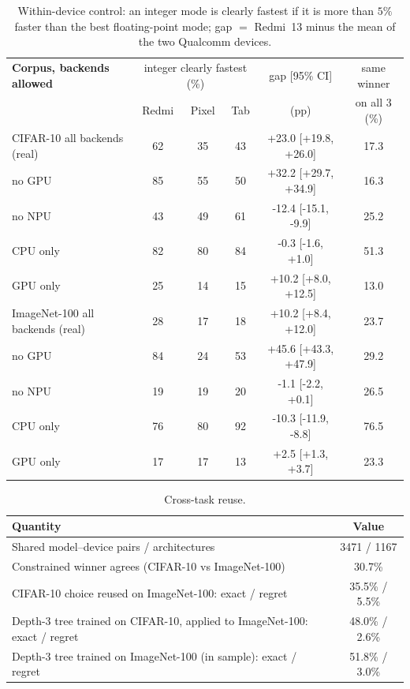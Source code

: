 \begin{table}[!t]
\centering
\caption{Within-device control: an integer mode is clearly fastest if it is more than $5\%$ faster than the best floating-point mode; gap $=$ Redmi~13 minus the mean of the two Qualcomm devices.}
\label{tab:virtual}
\footnotesize
\setlength{\tabcolsep}{3pt}
\begin{tabular}{@{}lccccc@{}}
\toprule
\textbf{Corpus, backends allowed} & \multicolumn{3}{c}{integer clearly fastest (\%)} & gap [95\% CI] & same winner \\
 & Redmi & Pixel & Tab & (pp) & on all 3 (\%) \\
\midrule
CIFAR-10 all backends (real) & 62 & 35 & 43 & +23.0 [+19.8, +26.0] & 17.3 \\
 no GPU & 85 & 55 & 50 & +32.2 [+29.7, +34.9] & 16.3 \\
 no NPU & 43 & 49 & 61 & -12.4 [-15.1, -9.9] & 25.2 \\
 CPU only & 82 & 80 & 84 & -0.3 [-1.6, +1.0] & 51.3 \\
 GPU only & 25 & 14 & 15 & +10.2 [+8.0, +12.5] & 13.0 \\
\midrule
ImageNet-100 all backends (real) & 28 & 17 & 18 & +10.2 [+8.4, +12.0] & 23.7 \\
 no GPU & 84 & 24 & 53 & +45.6 [+43.3, +47.9] & 29.2 \\
 no NPU & 19 & 19 & 20 & -1.1 [-2.2, +0.1] & 26.5 \\
 CPU only & 76 & 80 & 92 & -10.3 [-11.9, -8.8] & 76.5 \\
 GPU only & 17 & 17 & 13 & +2.5 [+1.3, +3.7] & 23.3 \\
\bottomrule
\end{tabular}
\end{table}

\begin{table}[!t]
\centering
\caption{Cross-task reuse.}
\label{tab:crosstask}
\footnotesize
\setlength{\tabcolsep}{3pt}
\begin{tabular}{@{}lc@{}}
\toprule
\textbf{Quantity} & \textbf{Value} \\
\midrule
Shared model--device pairs / architectures & 3471 / 1167 \\
Constrained winner agrees (CIFAR-10 vs ImageNet-100) & 30.7\% \\
CIFAR-10 choice reused on ImageNet-100: exact / regret & 35.5\% / 5.5\% \\
Depth-3 tree trained on CIFAR-10, applied to ImageNet-100: exact / regret & 48.0\% / 2.6\% \\
Depth-3 tree trained on ImageNet-100 (in sample): exact / regret & 51.8\% / 3.0\% \\
\bottomrule
\end{tabular}
\end{table}
